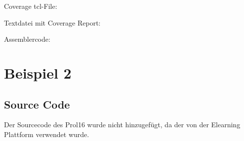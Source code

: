 \documentclass[12pt,a4paper]{article}
\begin{document}
Coverage tcl-File:


Textdatei mit Coverage Report:


Assemblercode:



\section{Beispiel 2}

\subsection{Source Code}

Der Sourcecode des Prol16 wurde nicht hinzugefügt, da der von der Elearning Plattform verwendet wurde.







%




\end{document}
